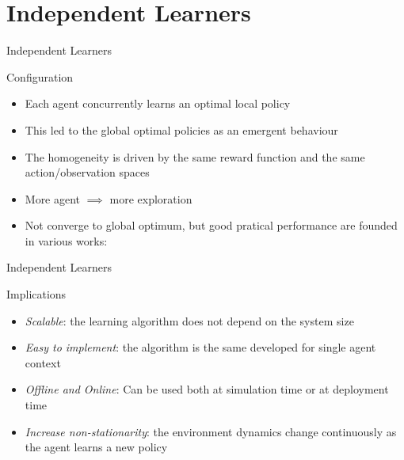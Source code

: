 \documentclass[presentation]{beamer}\mode<presentation>{\usetheme{AMSBolognaFC}}
\begin{document}
\section{Independent Learners}
\begin{frame}{Independent Learners}
	\begin{exampleblock}{Configuration}
		\begin{itemize}
			\item Each agent concurrently learns an optimal local policy
			\item This led to the global optimal policies as an emergent behaviour
			\item The homogeneity is driven by the same reward function and the same action/observation spaces
			\item More agent $\implies$ more exploration
			\item Not converge to global optimum, but good pratical performance are founded in various works: \parencite{DBLP:conf/atal/TumerA07, DBLP:conf/atal/TumerAW02, DBLP:conf/iros/WangS06}
		\end{itemize}
	\end{exampleblock}
\end{frame}
\begin{frame}{Independent Learners}
	\begin{exampleblock}{Implications}
		\begin{itemize}
			\item [{\color{teal} \faThumbsUp}] \emph{Scalable}: the learning algorithm does not depend on the system size
			\item [{\color{teal} \faThumbsUp}] \emph{Easy to implement}: the algorithm is the same developed for single agent context
			\item [{\color{teal} \faThumbsUp}] \emph{Offline and Online}: Can be used both at simulation time or at deployment time
			\item [{\color{red} \faThumbsDown}] \emph{Increase non-stationarity}: the environment dynamics change continuously as the agent learns a new policy
		\end{itemize}
	\end{exampleblock}
\end{frame}
\end{document}
